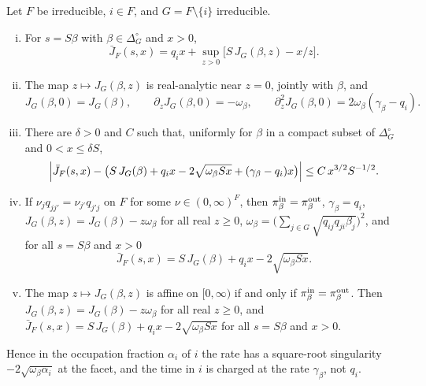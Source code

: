 \begin{proposition}\label{prop:layer-constants}
Let $F$ be irreducible, $i\in F$, and $G=F\setminus\{i\}$ irreducible.
\begin{enumerate}[(i)]
\item For $s=S\beta$ with $\beta\in\Delta_G^\circ$ and $x>0$,
\[
\bar J_F(s,x)=q_ix+\sup_{z>0}\bigl[S\,J_G(\beta,z)-x/z\bigr].
\]
\item The map $z\mapsto J_G(\beta,z)$ is real-analytic near $z=0$, jointly with $\beta$, and
\[
J_G(\beta,0)=J_G(\beta),\qquad \partial_zJ_G(\beta,0)=-\omega_\beta,\qquad
\partial_z^2J_G(\beta,0)=2\omega_\beta(\gamma_\beta-q_i).
\]
\item There are $\delta>0$ and $C$ such that, uniformly for $\beta$ in a compact subset of
$\Delta_G^\circ$ and $0<x\le\delta S$,
\[
\Bigl|\bar J_F(s,x)-\bigl(S\,J_G(\beta)+q_ix-2\sqrt{\omega_\beta Sx}+(\gamma_\beta-q_i)x\bigr)\Bigr|\le C\,x^{3/2}S^{-1/2}.
\]
\item If $\nu_jq_{jj'}=\nu_{j'}q_{j'j}$ on $F$ for some $\nu\in(0,\infty)^F$, then
$\pi^{\rm in}_\beta=\pi^{\rm out}_\beta$, $\gamma_\beta=q_i$, $J_G(\beta,z)=J_G(\beta)-z\omega_\beta$
for all real $z\ge0$, $\omega_\beta=\bigl(\sum_{j\in G}\sqrt{q_{ij}q_{ji}\beta_j}\bigr)^2$, and
for all $s=S\beta$ and $x>0$
\[
\bar J_F(s,x)=S\,J_G(\beta)+q_ix-2\sqrt{\omega_\beta Sx}.
\]
\item The map $z\mapsto J_G(\beta,z)$ is affine on $[0,\infty)$ if and only if
$\pi^{\rm in}_\beta=\pi^{\rm out}_\beta$. Then $J_G(\beta,z)=J_G(\beta)-z\omega_\beta$ for all
real $z\ge0$, and $\bar J_F(s,x)=S\,J_G(\beta)+q_ix-2\sqrt{\omega_\beta Sx}$ for all
$s=S\beta$ and $x>0$.
\end{enumerate}
\end{proposition}

Hence in the occupation fraction $\alpha_i$ of $i$ the rate has a square-root singularity
$-2\sqrt{\omega_\beta\alpha_i}$ at the facet, and the time in $i$ is charged at the rate
$\gamma_\beta$, not $q_i$.


